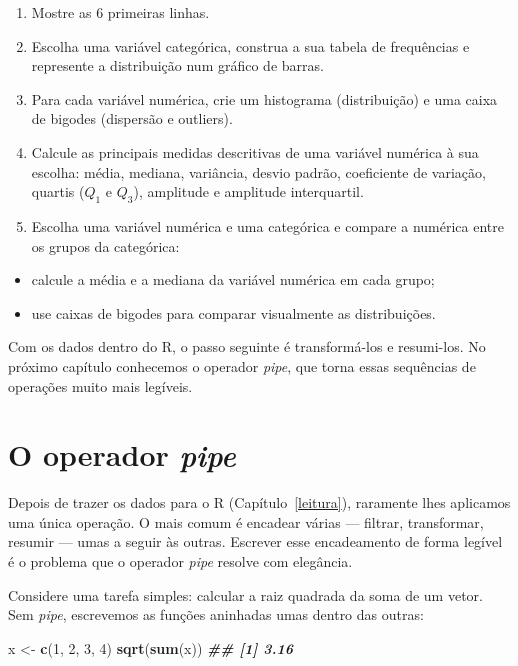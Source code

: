 \documentclass[
  portuguese,
  11pt,
  openany]{book}
\newenvironment{Shaded}{\begin{snugshade}}{\end{snugshade}}
\newcommand{\DecValTok}[1]{\textcolor[rgb]{0.00,0.00,0.81}{#1}}
\newcommand{\DocumentationTok}[1]{\textcolor[rgb]{0.56,0.35,0.01}{\textbf{\textit{#1}}}}
\newcommand{\FunctionTok}[1]{\textcolor[rgb]{0.13,0.29,0.53}{\textbf{#1}}}
\newcommand{\NormalTok}[1]{#1}
\newcommand{\OtherTok}[1]{\textcolor[rgb]{0.56,0.35,0.01}{#1}}
\providecommand{\tightlist}{%
  \setlength{\itemsep}{0pt}\setlength{\parskip}{0pt}}
\begin{document}
\begin{enumerate}
\def\labelenumi{(\alph{enumi})}
\item
  Mostre as 6 primeiras linhas.
\item
  Escolha uma variável categórica, construa a sua tabela de frequências e
  represente a distribuição num gráfico de barras.
\item
  Para cada variável numérica, crie um histograma (distribuição) e uma caixa de
  bigodes (dispersão e outliers).
\item
  Calcule as principais medidas descritivas de uma variável numérica à sua
  escolha: média, mediana, variância, desvio padrão, coeficiente de variação,
  quartis (\(Q_1\) e \(Q_3\)), amplitude e amplitude interquartil.
\item
  Escolha uma variável numérica e uma categórica e compare a numérica entre os
  grupos da categórica:
\end{enumerate}

\begin{itemize}
\tightlist
\item
  calcule a média e a mediana da variável numérica em cada grupo;
\item
  use caixas de bigodes para comparar visualmente as distribuições.
\end{itemize}

Com os dados dentro do R, o passo seguinte é transformá-los e resumi-los. No próximo
capítulo conhecemos o operador \emph{pipe}, que torna essas sequências de operações
muito mais legíveis.

\chapter{\texorpdfstring{O operador \emph{pipe}}{O operador pipe}}\label{pipe}

Depois de trazer os dados para o R (Capítulo~\ref{leitura}), raramente lhes
aplicamos uma única operação. O mais comum é encadear várias --- filtrar, transformar,
resumir --- umas a seguir às outras. Escrever esse encadeamento de forma legível é o
problema que o operador \emph{pipe} resolve com elegância.

Considere uma tarefa simples: calcular a raiz quadrada da soma de um vetor. Sem
\emph{pipe}, escrevemos as funções aninhadas umas dentro das outras:

\begin{Shaded}
\begin{Highlighting}[]
\NormalTok{x }\OtherTok{\textless{}{-}} \FunctionTok{c}\NormalTok{(}\DecValTok{1}\NormalTok{, }\DecValTok{2}\NormalTok{, }\DecValTok{3}\NormalTok{, }\DecValTok{4}\NormalTok{)}
\FunctionTok{sqrt}\NormalTok{(}\FunctionTok{sum}\NormalTok{(x))}
\DocumentationTok{\#\# [1] 3.16}
\end{Highlighting}
\end{Shaded}
\end{document}

